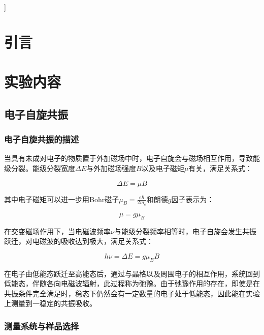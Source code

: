 \documentclass{thuemp}
\begin{document}
    ]
    \wuhao 
    
    \section{引言}
    \enlargethispage{-3.3cm}
    \section{实验内容}
    
    \subsection{电子自旋共振}
    
    \subsubsection{电子自旋共振的描述}
    
    当具有未成对电子的物质置于外加磁场中时，电子自旋会与磁场相互作用，导致能级分裂。能级分裂宽度$\Delta E$与外加磁场强度$B$以及电子磁矩$\mu$有关，满足关系式：
    
    \begin{equation}
    \Delta E = \mu B
    \end{equation}
    
    其中电子磁矩可以进一步用Bohr磁子$\mu_B = \frac{e\hbar}{2m_e}$和朗德$g$因子表示为：
    
    \begin{equation}
    \mu = g \mu_B
    \end{equation}
    
    在交变磁场作用下，当电磁波频率$\nu$与能级分裂频率相等时，电子自旋会发生共振跃迁，对电磁波的吸收达到极大，满足关系式：
    
    \begin{equation}
    h \nu  = \Delta E = g \mu_B B
    \end{equation}
    
    在电子由低能态跃迁至高能态后，通过与晶格以及周围电子的相互作用，系统回到低能态，伴随各向电磁波辐射，此过程称为弛豫。由于弛豫作用的存在，即使是在共振条件完全满足时，稳态下仍然会有一定数量的电子处于低能态，因此能在实验上测量到一稳定的共振吸收。
    
    \subsubsection{测量系统与样品选择}
    
\end{document}
